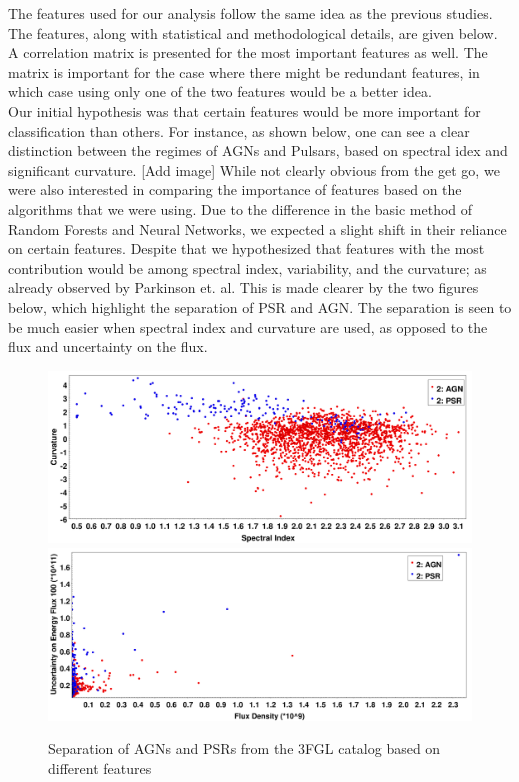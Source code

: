 The features used for our analysis follow the same idea as the previous studies. The features, along with statistical and methodological details, are given below. A correlation matrix is presented for the most important features as well. The matrix is important for the case where there might be redundant features, in which case using only one of the two features would be a better idea.\\




Our initial hypothesis was that certain features would be more important for classification than others. For instance, as shown below, one can see a clear distinction between the regimes of AGNs and Pulsars, based on spectral idex and significant curvature. [Add image] While not clearly obvious from the get go, we were also interested in comparing the importance of features based on the algorithms that we were using. Due to the difference in the basic method of Random Forests and Neural Networks, we expected a slight shift in their reliance on certain features. Despite that we hypothesized that features with the most contribution would be among spectral index, variability, and the curvature; as already observed by Parkinson et. al. This is made clearer by the two figures below, which highlight the separation of PSR and AGN. The separation is seen to be much easier when spectral index and curvature are used, as opposed to the flux and uncertainty on the flux.\\

\begin{figure}[h]
\includegraphics[width=\onepic\textwidth]{plots/signifcurvvsspecind2.pdf}
\includegraphics[width=\onepic\textwidth]{plots/fluxvsunc.pdf}
\caption{Separation of AGNs and PSRs from the 3FGL catalog based on different features}
\label{fig:corr}
\end{figure}




